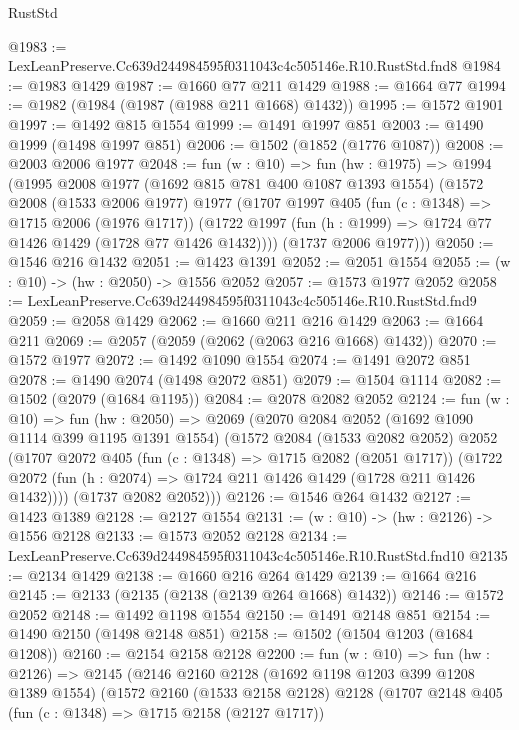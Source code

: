 \begin{lexlean}{RustStd}
\begin{coremodule}
@1983 := LexLeanPreserve.Cc639d244984595f0311043c4c505146e.R10.RustStd.fnd8
@1984 := @1983 @1429
@1987 := @1660 @77 @211 @1429
@1988 := @1664 @77
@1994 := @1982 (@1984 (@1987 (@1988 @211 @1668) @1432))
@1995 := @1572 @1901
@1997 := @1492 @815 @1554
@1999 := @1491 @1997 @851
@2003 := @1490 @1999 (@1498 @1997 @851)
@2006 := @1502 (@1852 (@1776 @1087))
@2008 := @2003 @2006 @1977
@2048 := fun (w : @10) =>
  fun (hw : @1975) =>
  @1994
    (@1995
      @2008
      @1977
      (@1692 @815 @781 @400 @1087 @1393 @1554)
      (@1572
        @2008
        (@1533 @2006 @1977)
        @1977
        (@1707
          @1997
          @405
          (fun (c : @1348) => @1715 @2006 (@1976 @1717))
          (@1722 @1997 (fun (h : @1999) => @1724 @77 @1426 @1429 (@1728 @77 @1426 @1432))))
        (@1737 @2006 @1977)))
@2050 := @1546 @216 @1432
@2051 := @1423 @1391
@2052 := @2051 @1554
@2055 := (w : @10) -> (hw : @2050) -> @1556 @2052
@2057 := @1573 @1977 @2052
@2058 := LexLeanPreserve.Cc639d244984595f0311043c4c505146e.R10.RustStd.fnd9
@2059 := @2058 @1429
@2062 := @1660 @211 @216 @1429
@2063 := @1664 @211
@2069 := @2057 (@2059 (@2062 (@2063 @216 @1668) @1432))
@2070 := @1572 @1977
@2072 := @1492 @1090 @1554
@2074 := @1491 @2072 @851
@2078 := @1490 @2074 (@1498 @2072 @851)
@2079 := @1504 @1114
@2082 := @1502 (@2079 (@1684 @1195))
@2084 := @2078 @2082 @2052
@2124 := fun (w : @10) =>
  fun (hw : @2050) =>
  @2069
    (@2070
      @2084
      @2052
      (@1692 @1090 @1114 @399 @1195 @1391 @1554)
      (@1572
        @2084
        (@1533 @2082 @2052)
        @2052
        (@1707
          @2072
          @405
          (fun (c : @1348) => @1715 @2082 (@2051 @1717))
          (@1722 @2072 (fun (h : @2074) => @1724 @211 @1426 @1429 (@1728 @211 @1426 @1432))))
        (@1737 @2082 @2052)))
@2126 := @1546 @264 @1432
@2127 := @1423 @1389
@2128 := @2127 @1554
@2131 := (w : @10) -> (hw : @2126) -> @1556 @2128
@2133 := @1573 @2052 @2128
@2134 := LexLeanPreserve.Cc639d244984595f0311043c4c505146e.R10.RustStd.fnd10
@2135 := @2134 @1429
@2138 := @1660 @216 @264 @1429
@2139 := @1664 @216
@2145 := @2133 (@2135 (@2138 (@2139 @264 @1668) @1432))
@2146 := @1572 @2052
@2148 := @1492 @1198 @1554
@2150 := @1491 @2148 @851
@2154 := @1490 @2150 (@1498 @2148 @851)
@2158 := @1502 (@1504 @1203 (@1684 @1208))
@2160 := @2154 @2158 @2128
@2200 := fun (w : @10) =>
  fun (hw : @2126) =>
  @2145
    (@2146
      @2160
      @2128
      (@1692 @1198 @1203 @399 @1208 @1389 @1554)
      (@1572
        @2160
        (@1533 @2158 @2128)
        @2128
        (@1707
          @2148
          @405
          (fun (c : @1348) => @1715 @2158 (@2127 @1717))

\end{coremodule}
\end{lexlean}
